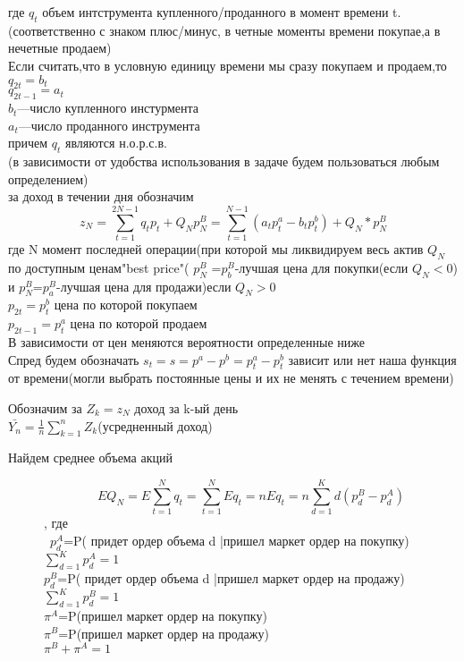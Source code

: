 \documentclass[12 pt, russian]{article}
\begin{document}
где $q_t$ объем интструмента купленного/проданного в момент времени t.(соответственно с знаком плюс/минус, в четные моменты времени покупае,а в нечетные продаем)\\

Если считать,что в условную единицу времени мы сразу покупаем и продаем,то\\
$q_{2t}=b_t$\\
$q_{2t-1}=a_t$\\
$b_t$---число купленного инстурмента\\
$a_t$---число проданного инструмента\\
причем $q_t$ являются н.о.р.с.в.\\
(в зависимости от удобства использования в задаче будем пользоваться любым определением)\\
 за доход в течении дня обозначим
$$z_N=\sum_{t=1}^{2N-1} q_tp_t +Q_Np_N^B=\sum_{t=1}^{N-1}(a_tp_t^a-b_tp_t^b) +Q_N*p_N^B$$где N момент последней операции(при которой мы ликвидируем весь актив $Q_N$ по доступным ценам"best price"( $p_N^B$ =$p_b^B$-лучшая цена для покупки(если $Q_N<0$) и $p_N^B$=$p_a^B$-лучшая цена для продажи)если $Q_N>0$\\
$p_{2t}=p_t^b$ цена по которой покупаем\\
$p_{2t-1}=p_t^a$ цена по которой продаем\\
В зависимости от цен меняются вероятности определенные ниже\\

 Спред будем обозначать $s_t=s=p^a-p^b=p_t^a-p_t^b$ зависит или нет наша функция от времени(могли выбрать постоянные цены и их не менять с течением времени)

 Обозначим за $Z_k=z_N$ доход за k-ый день\\

 $\bar{Y_n}=\frac{1}{n}\sum_{k=1}^nZ_k$(усредненный доход)\\



\begin{description}
\item[Найдем среднее объема акций]
$$EQ_N=E\sum_{t=1}^{N}q_t=\sum_{t=1}^NEq_t=nEq_t=n\sum_{d=1}^{K}d(p_d^B-p_d^A)$$, где\\\
$p_d^A$=P( придет ордер объема d |пришел маркет ордер на покупку) $\sum_{d=1}^K p_d^A=1$\\
$p_d^B$=P( придет ордер объема d |пришел маркет ордер на продажу) $\sum_{d=1}^K p_d^B=1$\\
$\pi^A$=P(пришел маркет ордер на покупку) \\
$\pi^B$=P(пришел маркет ордер на продажу) \\
$\pi^B+\pi^A=1$\\
\end{description}
\end{document}
